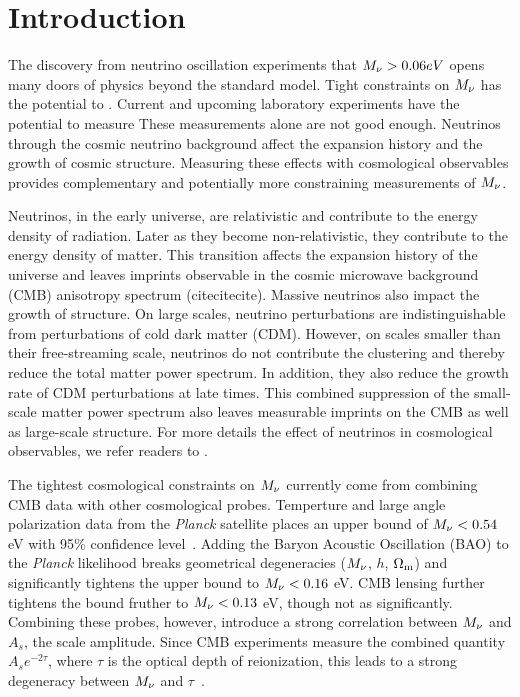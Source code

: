 \section{Introduction}
The discovery from neutrino oscillation experiments that $M_\nu > 0.06eV$
opens many doors of physics beyond the standard model. Tight constraints on $M_\nu$ 
has the potential to . 
Current and upcoming laboratory experiments have the potential to measure 
These measurements alone are not good enough. 
Neutrinos through the cosmic neutrino background affect the expansion history 
and the growth of cosmic structure. Measuring these effects with cosmological 
observables provides complementary and potentially more constraining 
measurements of $M_\nu$. 

Neutrinos, in the early universe, are relativistic and contribute to the 
energy density of radiation. Later as they become non-relativistic, 
they contribute to the energy density of matter. This transition affects 
the expansion history of the universe and leaves imprints observable in 
the cosmic microwave background (CMB) anisotropy spectrum (citecitecite). 
Massive neutrinos also impact the growth of structure. On large scales, 
neutrino perturbations are indistinguishable from perturbations of cold 
dark matter (CDM). However, on scales smaller than their free-streaming 
scale, neutrinos do not contribute the clustering and thereby reduce the
total matter power spectrum. In addition, they also reduce the growth 
rate of CDM perturbations at late times. This combined suppression of 
the small-scale matter power spectrum also leaves measurable imprints 
on the CMB as well as large-scale structure. For more details the effect
of neutrinos in cosmological observables, we refer readers to 
\cite{lesgourgues2012,lesgourgues2014,gerbino2018}. 

The tightest cosmological constraints on $M_\nu$ currently come from 
combining CMB data with other cosmological probes. Temperture and large 
angle polarization data from the {\em Planck} satellite places an upper 
bound of $M_\nu < 0.54$ eV with 95\% confidence level~\citep{planckcollaboration2018}. 
Adding the Baryon Acoustic Oscillation (BAO) to the {\em Planck} 
likelihood breaks geometrical degeneracies ($M_\nu$, $h$, $\Omega_{\rm m}$) 
and significantly tightens the upper bound to $M_\nu < 0.16$ eV. CMB 
lensing further tightens the bound fruther to $M_\nu < 0.13$ eV, though 
not as significantly. Combining these probes, however, introduce a strong 
correlation between $M_\nu$ and $A_s$, the scale amplitude. Since CMB 
experiments measure the combined quantity $A_s e^{-2\tau}$, where 
$\tau$ is the optical depth of reionization, this leads to a strong 
degeneracy between $M_\nu$ and $\tau$~\citep{allison2015, liu2016, archidiacono2017}. 

